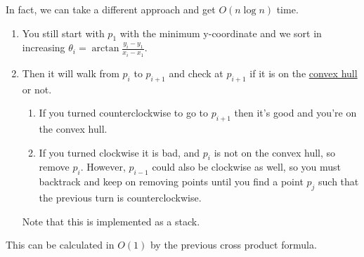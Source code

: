   \begin{example}
    \label{ex:convex-hull-with-graham-scan}
    In fact, we can take a different approach and get $O(n \log{n})$ time. 
    \begin{enumerate}
      \item You still start with $p_1$ with the minimum y-coordinate and we sort in increasing $\theta_i = \arctan \frac{y_i - y_1}{x_i - x_1}$. 
      \item Then it will walk from $p_i$ to $p_{i+1}$ and check at $p_{i+1}$ if it is on the \hyperref[alg-def:convex-hull]{convex hull} or not. 
        \begin{enumerate}
          \item If you turned counterclockwise to go to $p_{i+1}$ then it's good and you're on the convex hull. 
          \item If you turned clockwise it is bad, and $p_i$ is not on the convex hull, so remove $p_i$. However, $p_{i-1}$ could also be clockwise as well, so you must backtrack and keep on removing points until you find a point $p_j$ such that the previous turn is counterclockwise. 
        \end{enumerate}
        Note that this is implemented as a stack. 
    \end{enumerate}
    This can be calculated in $O(1)$ by the previous cross product formula. 
    \begin{figure}[H]
      \centering 
\end{figure}
\end{example}
